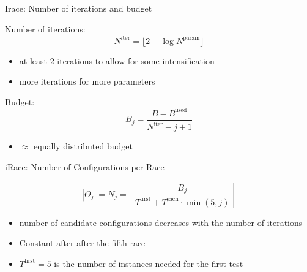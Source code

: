 \begin{frame}[c,fragile]{Irace: Number of iterations and budget}


Number of iterations:
\begin{equation}
N^{\text{iter}} = \lfloor 2 + \log{N^{\text{param}}} \rfloor \nonumber
\end{equation}

\medskip

\begin{itemize}
  \item at least $2$ iterations to allow for some intensification
  \item more iterations for more parameters
\end{itemize}

\bigskip
\pause

Budget:
\begin{equation}
B_j = \frac{B - B^{\text{used}}}{N^{\text{iter}}-j +1} \nonumber
\end{equation}

\begin{itemize}
  \item $\approx$ equally distributed budget
\end{itemize}

\end{frame}
\begin{frame}[c]{iRace: Number of Configurations per Race}

\begin{equation}
|\Theta_j| = N_j = \left\lfloor \frac{B_j}{T^{\text{first}} + T^{\text{each}} \cdot \min(5,j)} \right\rfloor \nonumber
\end{equation}

\begin{itemize}
  \item number of candidate configurations decreases with the number of iterations
  \item Constant after after the fifth race
  \item $T^{\text{first}}=5$ is the number of instances needed for the first test
\end{itemize}

\end{frame}
